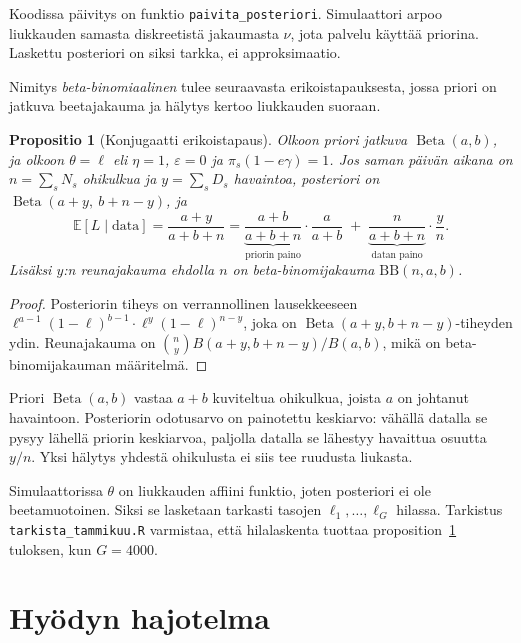 \documentclass[11pt,a4paper]{article}
\theoremstyle{plain}
\newtheorem{propositio}{Propositio}
\theoremstyle{definition}
\theoremstyle{remark}
\newcommand{\E}{\mathbb{E}}
\newcommand{\1}{\mathbf{1}}
\newcommand{\Beta}{\operatorname{Beta}}
\begin{document}
Koodissa päivitys on funktio \texttt{paivita\_posteriori}. Simulaattori arpoo
liukkauden samasta diskreetistä jakaumasta $\nu$, jota palvelu käyttää
priorina. Laskettu posteriori on siksi tarkka, ei approksimaatio.

Nimitys \emph{beta-binomiaalinen} tulee seuraavasta erikoistapauksesta, jossa
priori on jatkuva beetajakauma ja hälytys kertoo liukkauden suoraan.

\begin{propositio}[Konjugaatti erikoistapaus]\label{pr:konjugaatti}
Olkoon priori jatkuva $\Beta(a,b)$, ja olkoon $\theta = \ell$ eli $\eta = 1$,
$\varepsilon = 0$ ja $\pi_s(1 - e\gamma) = 1$. Jos saman päivän aikana on
$n = \sum_s N_s$ ohikulkua ja $y = \sum_s D_s$ havaintoa, posteriori on
$\Beta(a + y,\ b + n - y)$, ja
\[
  \E[L \mid \text{data}] = \frac{a + y}{a + b + n}
  = \underbrace{\frac{a + b}{a + b + n}}_{\text{priorin paino}}\cdot\frac{a}{a+b}
  \;+\; \underbrace{\frac{n}{a + b + n}}_{\text{datan paino}}\cdot\frac{y}{n}.
\]
Lisäksi $y$:n reunajakauma ehdolla $n$ on beta-binomijakauma $\mathrm{BB}(n, a, b)$.
\end{propositio}

\begin{proof}
Posteriorin tiheys on verrannollinen lausekkeeseen
$\ell^{a-1}(1-\ell)^{b-1} \cdot \ell^{y}(1-\ell)^{n-y}$, joka on
$\Beta(a+y, b+n-y)$-tiheyden ydin. Reunajakauma on
$\binom{n}{y} B(a+y, b+n-y)/B(a,b)$, mikä on beta-binomijakauman määritelmä.
\end{proof}

\begin{intuitio}
Priori $\Beta(a,b)$ vastaa $a + b$ kuviteltua ohikulkua, joista $a$ on johtanut
havaintoon. Posteriorin odotusarvo on painotettu keskiarvo: vähällä datalla se
pysyy lähellä priorin keskiarvoa, paljolla datalla se lähestyy havaittua
osuutta $y/n$. Yksi hälytys yhdestä ohikulusta ei siis tee ruudusta liukasta.

Simulaattorissa $\theta$ on liukkauden affiini funktio, joten posteriori ei ole
beetamuotoinen. Siksi se lasketaan tarkasti tasojen $\ell_1, \dots, \ell_G$
hilassa. Tarkistus \texttt{tarkista\_tammikuu.R} varmistaa, että hilalaskenta
tuottaa proposition~\ref{pr:konjugaatti} tuloksen, kun $G = 4000$.
\end{intuitio}

\section{Hyödyn hajotelma}\label{sec:hajotelma}
\end{document}
